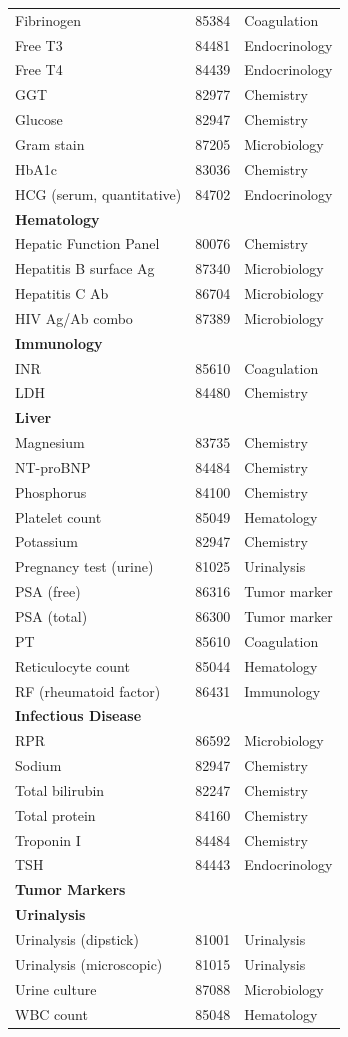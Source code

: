 \begin{longtable}{@{}lll@{}}
Fibrinogen & 85384 & Coagulation \\
Free T3 & 84481 & Endocrinology \\
Free T4 & 84439 & Endocrinology \\
GGT & 82977 & Chemistry \\
Glucose & 82947 & Chemistry \\
Gram stain & 87205 & Microbiology \\
HbA1c & 83036 & Chemistry \\
HCG (serum, quantitative) & 84702 & Endocrinology \\
\textbf{Hematology} & & \\
Hepatic Function Panel & 80076 & Chemistry \\
Hepatitis B surface Ag & 87340 & Microbiology \\
Hepatitis C Ab & 86704 & Microbiology \\
HIV Ag/Ab combo & 87389 & Microbiology \\
\textbf{Immunology} & & \\
INR & 85610 & Coagulation \\
LDH & 84480 & Chemistry \\
\textbf{Liver} & & \\
Magnesium & 83735 & Chemistry \\
NT-proBNP & 84484 & Chemistry \\
Phosphorus & 84100 & Chemistry \\
Platelet count & 85049 & Hematology \\
Potassium & 82947 & Chemistry \\
Pregnancy test (urine) & 81025 & Urinalysis \\
PSA (free) & 86316 & Tumor marker \\
PSA (total) & 86300 & Tumor marker \\
PT & 85610 & Coagulation \\
Reticulocyte count & 85044 & Hematology \\
RF (rheumatoid factor) & 86431 & Immunology \\
\textbf{Infectious Disease} & & \\
RPR & 86592 & Microbiology \\
Sodium & 82947 & Chemistry \\
Total bilirubin & 82247 & Chemistry \\
Total protein & 84160 & Chemistry \\
Troponin I & 84484 & Chemistry \\
TSH & 84443 & Endocrinology \\
\textbf{Tumor Markers} & & \\
\textbf{Urinalysis} & & \\
Urinalysis (dipstick) & 81001 & Urinalysis \\
Urinalysis (microscopic) & 81015 & Urinalysis \\
Urine culture & 87088 & Microbiology \\
WBC count & 85048 & Hematology \\
\bottomrule
\end{longtable}

